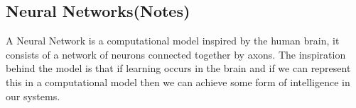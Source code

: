 \documentclass[a4paper,12pt]{report}
\begin{document}
		\subsection{Neural Networks(Notes)}
			A Neural Network is a computational model inspired by the human brain, it consists of a network of neurons connected together by axons. The inspiration behind the model is that if learning occurs in the brain and if we can represent this in a computational model then we can achieve some form of intelligence in our systems.
\end{document}
